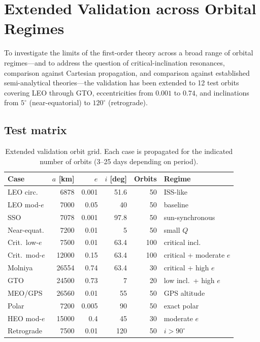 \documentclass[11pt]{article}
\begin{document}
\appendix

\section{Extended Validation across Orbital Regimes}
\label{sec:extended_validation}

To investigate the limits of the first-order theory across a broad range of
orbital regimes---and to address the question of critical-inclination
resonances, comparison against Cartesian propagation, and comparison against
established semi-analytical theories---the validation has been extended to 12
test orbits covering LEO through GTO, eccentricities from $0.001$ to $0.74$,
and inclinations from $5^\circ$ (near-equatorial) to $120^\circ$ (retrograde).

\subsection{Test matrix}

\begin{table}[ht]
\centering
\caption{Extended validation orbit grid. Each case is propagated for the
indicated number of orbits (3--25 days depending on period).}
\label{tab:ext_orbits}
\small
\begin{tabular}{@{}lrrrrl@{}}
\toprule
Case & $a$ [km] & $e$ & $i$ [deg] & Orbits & Regime \\
\midrule
LEO circ.       & 6878  & 0.001 & 51.6   & 50  & ISS-like \\
LEO mod-$e$     & 7000  & 0.05  & 40     & 50  & baseline \\
SSO             & 7078  & 0.001 & 97.8   & 50  & sun-synchronous \\
Near-equat.     & 7200  & 0.01  & 5      & 50  & small $Q$ \\
Crit.\ low-$e$  & 7500  & 0.01  & 63.4   & 100 & critical incl.\ \\
Crit.\ mod-$e$  & 12000 & 0.15  & 63.4   & 100 & critical + moderate $e$ \\
Molniya         & 26554 & 0.74  & 63.4   & 30  & critical + high $e$ \\
GTO             & 24500 & 0.73  & 7      & 20  & low incl.\ + high $e$ \\
MEO/GPS         & 26560 & 0.01  & 55     & 50  & GPS altitude \\
Polar           & 7200  & 0.005 & 90     & 50  & exact polar \\
HEO mod-$e$     & 15000 & 0.4   & 45     & 30  & moderate $e$ \\
Retrograde      & 7500  & 0.01  & 120    & 50  & $i > 90^\circ$ \\
\bottomrule
\end{tabular}
\end{table}
\end{document}
